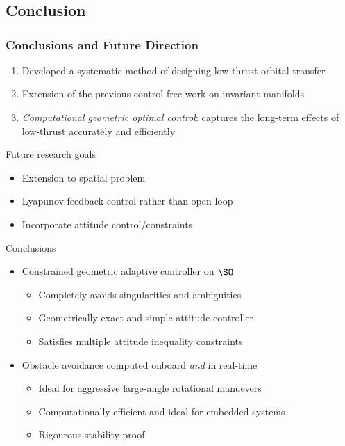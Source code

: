

\section*{}
\subsection*{Conclusion}
\begin{frame} %
\frametitle{Conclusions and Future Direction}
  \begin{enumerate}
    \item<+-> Developed a systematic method of designing low-thrust orbital transfer
    \item<+-> Extension of the previous control free work on invariant manifolds
    \item<+-> \emph{Computational geometric optimal control}: captures the long-term effects of low-thrust accurately and efficiently   
  \end{enumerate}
  \pause
  Future research goals
    \begin{itemize} 
      \item Extension to spatial problem 
      \item Lyapunov feedback control rather than open loop 
      \item Incorporate attitude control/constraints 
    \end{itemize}
\end{frame}   %


\begin{frame}{Conclusions} %

    \begin{itemize}
        \item Constrained geometric adaptive controller on \( \SO \)
        \begin{itemize}
            \item Completely avoids singularities and ambiguities 
            \item Geometrically exact and simple attitude controller
            \item Satisfies multiple attitude inequality constraints 
        \end{itemize}
        \pause
        \vs
        \item Obstacle avoidance computed onboard \emph{and} in real-time
        \begin{itemize}
            \item Ideal for aggressive large-angle rotational manuevers
            \item Computationally efficient and ideal for embedded systems 
            \item Rigourous stability proof 
        \end{itemize}
    \end{itemize}

\end{frame}   %

